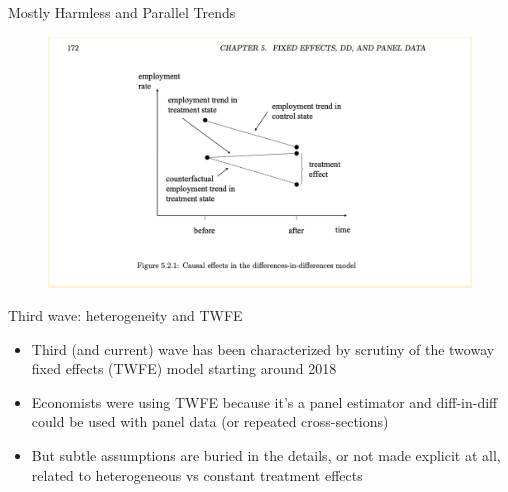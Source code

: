 \documentclass{beamer}
\begin{document}
\begin{frame}{Mostly Harmless and Parallel Trends}


	\begin{figure}
	\includegraphics[scale=0.45]{./lecture_includes/mhe_pt}
	\end{figure}



\end{frame}




\begin{frame}{Third wave: heterogeneity and TWFE}

\begin{itemize}

\item Third (and current) wave has been characterized by scrutiny of the twoway fixed effects (TWFE) model starting around 2018
\item Economists were using TWFE because it's a panel estimator and diff-in-diff could be used with panel data (or repeated cross-sections)
\item But subtle assumptions are buried in the details, or not made explicit at all, related to heterogeneous vs constant treatment effects


\end{itemize}

\end{frame}
\end{document}
